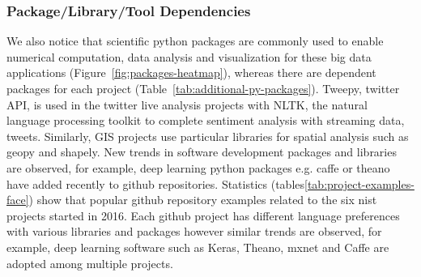 \documentclass[9pt,twocolumn,twoside]{styles/osajnl}
\begin{document}
\subsubsection{Package/Library/Tool Dependencies}

We also notice that scientific python packages are commonly used to enable
numerical computation, data analysis and visualization for these big data
applications (Figure~\ref{fig:packages-heatmap}), whereas there are dependent
packages for each project (Table~\ref{tab:additional-py-packages}). Tweepy,
twitter API, is used in the twitter live analysis projects with NLTK, the
natural language processing toolkit to complete sentiment analysis with
streaming data, tweets. Similarly, GIS projects use particular libraries for
spatial analysis such as geopy and shapely. New trends in software development
packages and libraries are observed, for example, deep learning python packages
e.g. caffe or theano have added recently to github repositories. Statistics
(tables\ref{tab:project-examples-face}) show that popular github repository
examples related to the six nist projects started in 2016. Each github project
has different language preferences with various libraries and packages however
similar trends are observed, for example, deep learning software such as Keras,
Theano, mxnet and Caffe are adopted among multiple projects.
\end{document}
